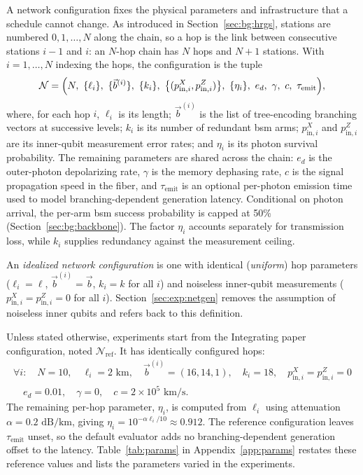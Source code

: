 A network configuration fixes the physical parameters and infrastructure that a schedule cannot change. As introduced in Section~\ref{sec:bg:hrgs}, stations are numbered $0,1,\dots,N$ along the chain, so a hop is the link between consecutive stations $i-1$ and $i$: an $N$-hop chain has $N$ hops and $N+1$ stations. With $i=1,\dots,N$ indexing the hops, the configuration is the tuple
\[
    \mathcal{N} = \Bigl(N,\ \{\ell_i\},\ \{\vec{b}^{(i)}\},\ \{k_i\},\ \bigl\{(p_{\mathrm{in},i}^{X}, p_{\mathrm{in},i}^{Z})\bigr\},\ \{\eta_i\},\ e_d,\ \gamma,\ c,\ \tau_{\mathrm{emit}}\Bigr),
\]
where, for each hop $i$, $\ell_i$ is its length; $\vec{b}^{(i)}$ is the list of tree-encoding branching vectors at successive levels; $k_i$ is its number of redundant \Gls{bsm} arms; $p_{\mathrm{in},i}^{X}$ and $p_{\mathrm{in},i}^{Z}$ are its inner-qubit measurement error rates; and $\eta_i$ is its photon survival probability. The remaining parameters are shared across the chain: $e_d$ is the outer-photon depolarizing rate, $\gamma$ is the memory dephasing rate, $c$ is the signal propagation speed in the fiber, and $\tau_{\mathrm{emit}}$ is an optional per-photon emission time used to model branching-dependent generation latency. Conditional on photon arrival, the per-arm \Gls{bsm} success probability is capped at 50\%~\cite{Ewert20143,Benchasattabuse2026Bridging} (Section~\ref{sec:bg:backbone}). The factor $\eta_i$ accounts separately for transmission loss, while $k_i$ supplies redundancy against the measurement ceiling.

An \emph{idealized network configuration} is one with identical (\emph{uniform}) hop parameters ($\ell_i=\ell$, $\vec b^{(i)}=\vec b$, $k_i=k$ for all $i$) and noiseless inner-qubit measurements ($p_{\mathrm{in},i}^{X}=p_{\mathrm{in},i}^{Z}=0$ for all $i$). Section~\ref{sec:exp:netgen} removes the assumption of noiseless inner qubits and refers back to this definition.

Unless stated otherwise, experiments start from the Integrating paper configuration, noted $\mathcal{N}_{\mathrm{ref}}$. It has identically configured hops:
\[
\begin{gathered}
    \forall i:\quad N = 10,\quad \ell_i = 2\text{ km},\quad \vec{b}^{(i)} = (16,14,1),\quad k_i = 18,\quad p_{\mathrm{in},i}^{X} = p_{\mathrm{in},i}^{Z} = 0\\
    \quad e_d = 0.01,\quad \gamma = 0,\quad c = 2\times 10^{5}\text{ km/s}.
\end{gathered}
\]
The remaining per-hop parameter, $\eta_i$, is computed from $\ell_i$ using attenuation $\alpha=0.2\text{ dB/km}$, giving $\eta_i=10^{-\alpha\ell_i/10}\approx0.912$. The reference configuration leaves $\tau_{\mathrm{emit}}$ unset, so the default evaluator adds no branching-dependent generation offset to the latency. Table~\ref{tab:params} in Appendix~\ref{app:params} restates these reference values and lists the parameters varied in the experiments.

